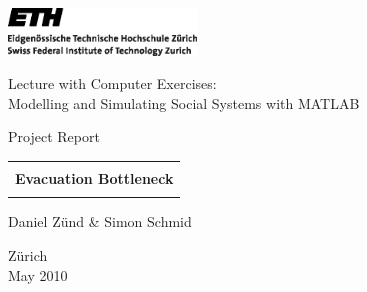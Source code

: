 
\thispagestyle{empty}

\begin{center}
\includegraphics[width=5cm]{ETHlogo.eps}

\bigskip


\bigskip


\bigskip


\LARGE{ 	Lecture with Computer Exercises:\\ }
\LARGE{ Modelling and Simulating Social Systems with MATLAB\\}

\bigskip

\bigskip

\small{Project Report}\\

\bigskip

\bigskip

\bigskip

\bigskip


\begin{tabular}{|c|}
\hline
\\
\textbf{\LARGE{Evacuation Bottleneck}}\\
\\
\hline
\end{tabular}
\bigskip

\bigskip

\bigskip

\LARGE{Daniel Z\"und \& Simon Schmid}



\bigskip

\bigskip

\bigskip

\bigskip

\bigskip

\bigskip

\bigskip

\bigskip

Z\"urich\\
May 2010\\

\end{center}


